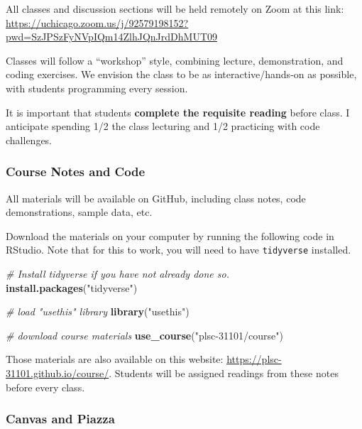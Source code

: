 \documentclass[
]{book}
\newenvironment{Shaded}{\begin{snugshade}}{\end{snugshade}}
\newcommand{\CommentTok}[1]{\textcolor[rgb]{0.56,0.35,0.01}{\textit{#1}}}
\newcommand{\KeywordTok}[1]{\textcolor[rgb]{0.13,0.29,0.53}{\textbf{#1}}}
\newcommand{\NormalTok}[1]{#1}
\newcommand{\StringTok}[1]{\textcolor[rgb]{0.31,0.60,0.02}{#1}}
\begin{document}
All classes and discussion sections will be held remotely on Zoom at this link: \url{https://uchicago.zoom.us/j/92579198152?pwd=SzJPSzFyNVpIQm14ZlhJQnJrdDhMUT09}

Classes will follow a ``workshop'' style, combining lecture, demonstration, and coding exercises. We envision the class to be as interactive/hands-on as possible, with students programming every session.

It is important that students \textbf{complete the requisite reading} before class. I anticipate spending 1/2 the class lecturing and 1/2 practicing with code challenges.

\hypertarget{course-notes-and-code}{%
\subsubsection*{Course Notes and Code}\label{course-notes-and-code}}

All materials will be available on GitHub, including class notes, code demonstrations, sample data, etc.

Download the materials on your computer by running the following code in RStudio. Note that for this to work, you will need to have \texttt{tidyverse} installed.

\begin{Shaded}
\begin{Highlighting}[]
\CommentTok{# Install tidyverse if you have not already done so.}
\KeywordTok{install.packages}\NormalTok{(}\StringTok{"tidyverse"}\NormalTok{)}

\CommentTok{# load "usethis" library}
\KeywordTok{library}\NormalTok{(}\StringTok{"usethis"}\NormalTok{)}

\CommentTok{# download course materials}
\KeywordTok{use_course}\NormalTok{(}\StringTok{"plsc-31101/course"}\NormalTok{)}
\end{Highlighting}
\end{Shaded}

Those materials are also available on this website: \url{https://plsc-31101.github.io/course/}. Students will be assigned readings from these notes before every class.

\hypertarget{canvas-and-piazza}{%
\subsubsection*{Canvas and Piazza}\label{canvas-and-piazza}}
\end{document}
